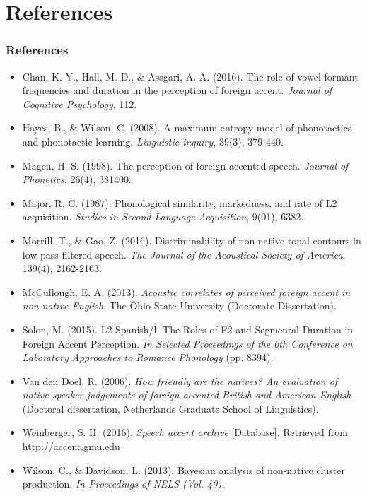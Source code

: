 \documentclass{beamer}
\begin{document}
\section{References}
\begin{frame}[shrink=20]
\frametitle{References}
\footnotesize{
\begin{itemize}
\item Chan, K. Y., Hall, M. D., \& Assgari, A. A. (2016). The role of vowel formant frequencies and duration in the perception of foreign accent. \emph {Journal of Cognitive Psychology}, 1\textendash{}12.
\item Hayes, B., \& Wilson, C. (2008). A maximum entropy model of phonotactics and phonotactic learning. \emph{Linguistic inquiry}, 39(3), 379-440.
\item Magen, H. S. (1998). The perception of foreign-accented speech. \emph{Journal of Phonetics}, 26(4), 381\textendash{}400.
\item Major, R. C. (1987). Phonological similarity, markedness, and rate of L2 acquisition. \emph{Studies in Second Language Acquisition}, 9(01), 63\textendash{}82.
\item Morrill, T., \& Gao, Z. (2016). Discriminability of non-native tonal contours in low-pass filtered speech. \emph{The Journal of the Acoustical Society of America}, 139(4), 2162-2163.
\item McCullough, E. A. (2013). \emph{Acoustic correlates of perceived foreign accent in non-native English}. The Ohio State University (Doctorate Dissertation). 
\item Solon, M. (2015). L2 Spanish/l: The Roles of F2 and Segmental Duration in Foreign Accent Perception. \emph{In Selected Proceedings of the 6th Conference on Laboratory Approaches to Romance Phonology} (pp. 83\textendash{}94). 
\item Van den Doel, R. (2006). \emph{How friendly are the natives? An evaluation of native-speaker judgements of foreign-accented British and American English }(Doctoral dissertation, Netherlands Graduate School of Linguistics).
\item Weinberger, S. H. (2016). \emph{Speech accent archive }[Database]. Retrieved from http://accent.gmu.edu
\item Wilson, C., \& Davidson, L. (2013). Bayesian analysis of non-native cluster production. \emph{In Proceedings of NELS (Vol. 40).} 


\end{itemize}}
\end{frame}
\end{document}
